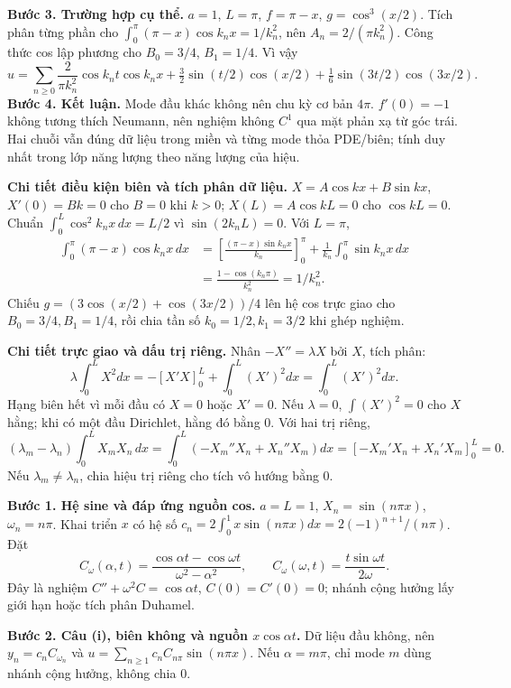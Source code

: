 \textbf{Bước 3. Trường hợp cụ thể.} $a=1$, $L=\pi$, $f=\pi-x$, $g=\cos^3(x/2)$. Tích phân từng phần cho $\int_0^\pi(\pi-x)\cos k_nx=1/k_n^2$, nên $A_n=2/(\pi k_n^2)$. Công thức cos lập phương cho $B_0=3/4$, $B_1=1/4$. Vì vậy
\[u=\sum_{n\ge0}\frac2{\pi k_n^2}\cos k_nt\cos k_nx
+\tfrac32\sin(t/2)\cos(x/2)+\tfrac16\sin(3t/2)\cos(3x/2).\]
\textbf{Bước 4. Kết luận.} Mode đầu khác không nên chu kỳ cơ bản $4\pi$. $f'(0)=-1$ không tương thích Neumann, nên nghiệm không $C^1$ qua mặt phản xạ từ góc trái. Hai chuỗi vẫn đúng dữ liệu trong miền và từng mode thỏa PDE/biên; tính duy nhất trong lớp năng lượng theo năng lượng của hiệu.

\textbf{Chi tiết điều kiện biên và tích phân dữ liệu.} $X=A\cos kx+B\sin kx$, $X'(0)=Bk=0$ cho $B=0$ khi $k>0$; $X(L)=A\cos kL=0$ cho $\cos kL=0$. Chuẩn $\int_0^L\cos^2k_nx\,dx=L/2$ vì $\sin(2k_nL)=0$. Với $L=\pi$,
\[\begin{aligned}
\int_0^\pi(\pi-x)\cos k_nx\,dx
&=\left[\frac{(\pi-x)\sin k_nx}{k_n}\right]_0^\pi
+\frac1{k_n}\int_0^\pi\sin k_nx\,dx\\
&=\frac{1-\cos(k_n\pi)}{k_n^2}=1/k_n^2.
\end{aligned}\]
Chiếu $g=(3\cos(x/2)+\cos(3x/2))/4$ lên hệ cos trực giao cho $B_0=3/4,B_1=1/4$, rồi chia tần số $k_0=1/2,k_1=3/2$ khi ghép nghiệm.

\textbf{Chi tiết trực giao và dấu trị riêng.} Nhân $-X''=\lambda X$ bởi $X$, tích phân:
\[\lambda\int_0^LX^2dx=-[X'X]_0^L+\int_0^L(X')^2dx=\int_0^L(X')^2dx.\]
Hạng biên hết vì mỗi đầu có $X=0$ hoặc $X'=0$. Nếu $\lambda=0$, $\int(X')^2=0$ cho $X$ hằng; khi có một đầu Dirichlet, hằng đó bằng $0$. Với hai trị riêng,
\[(\lambda_m-\lambda_n)\int_0^LX_mX_n\,dx
=\int_0^L(-X_m''X_n+X_n''X_m)dx
=[-X_m'X_n+X_n'X_m]_0^L=0.\]
Nếu $\lambda_m\ne\lambda_n$, chia hiệu trị riêng cho tích vô hướng bằng $0$.

\textbf{Bước 1. Hệ sine và đáp ứng nguồn cos.} $a=L=1$, $X_n=\sin(n\pi x)$, $\omega_n=n\pi$. Khai triển $x$ có hệ số $c_n=2\int_0^1x\sin(n\pi x)dx=2(-1)^{n+1}/(n\pi)$. Đặt
\[C_\omega(\alpha,t)=\frac{\cos\alpha t-\cos\omega t}{\omega^2-\alpha^2},\qquad
C_\omega(\omega,t)=\frac{t\sin\omega t}{2\omega}.\]
Đây là nghiệm $C''+\omega^2C=\cos\alpha t$, $C(0)=C'(0)=0$; nhánh cộng hưởng lấy giới hạn hoặc tích phân Duhamel.

\textbf{Bước 2. Câu (i), biên không và nguồn $x\cos\alpha t$.} Dữ liệu đầu không, nên $y_n=c_nC_{\omega_n}$ và $u=\sum_{n\ge1}c_nC_{n\pi}\sin(n\pi x)$. Nếu $\alpha=m\pi$, chỉ mode $m$ dùng nhánh cộng hưởng, không chia $0$.

